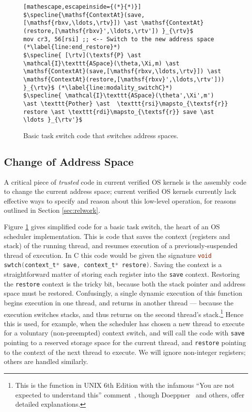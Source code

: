\begin{figure}
\begin{lstlisting}[mathescape,escapeinside={(*}{*)}]
$\specline{\mathsf{ContextAt}(save,[\mathsf{rbxv,\ldots,\rtv}]) \ast \mathsf{ContextAt}(restore,[\mathsf{rbxv}',\ldots,\rtv']) }_{\rtv}$
mov cr3, 56[rsi] ;; <-- Switch to the new address space (*\label{line:end_restore}*)
$\specline{ [\rtv](\textsf{P} \ast \mathcal{I}\texttt{ASpace}(\theta,\Xi,m) \ast \mathsf{ContextAt}(save,[\mathsf{rbxv,\ldots,\rtv}]) \ast \mathsf{ContextAt}(restore,[\mathsf{rbxv}',\ldots,\rtv']))  }_{\rtv}$ (*\label{line:modality_switchC}*)
$\specline{ \mathcal{I}\texttt{ASpace}(\theta',\Xi',m') \ast \texttt{Pother} \ast  \texttt{rsi}\mapsto_{\textsf{r}} restore \ast \texttt{rdi}\mapsto_{\textsf{r}} save \ast \ldots }_{\rtv'}$
\end{lstlisting}
\vspace{-1em}
\caption{Basic task switch code that switches address spaces.}
\label{fig:swtchC}
\end{figure}

\subsection{Change of Address Space}
A critical piece of \emph{trusted} code in current verified OS kernels is the assembly code to change the current address space; current verified OS kernels currently
lack effective ways to specify and reason about this low-level operation, for reasons outlined in Section \ref{sec:relwork}.

Figure \ref{fig:swtchC} gives simplified code for a basic task switch, the heart of an OS scheduler implementation. This is code that saves the context (registers and stack)
of the running thread, and resumes execution of a previously-suspended thread of execution.
In C this code would be given the signature
\mbox{\lstinline[language=C]|void swtch(context_t* save, context_t* restore)|}.
Saving the context is a straightforward matter of storing each register into the \lstinline|save| context.
Restoring the \lstinline|restore| context is the tricky bit, because both the stack pointer and address space must be restored.
Confusingly, a single dynamic execution of this function begins execution in one thread,
and returns in another thread --- because the execution switches stacks, and thus returns on the second thread's stack.\footnote{This is the function in UNIX 6th Edition 
with the infamous ``You are not expected to understand this'' comment~\cite{lions1996lions},
though Doeppner~\cite{doeppner2010operating} and others, offer detailed explanations.}
Hence this is used, for example, when the scheduler has chosen a new thread to execute for a voluntary (non-preempted)
context switch, and will call
the code with \lstinline|save| pointing to a reserved storage space for the current thread, and
\lstinline|restore| pointing to the context of the next thread to execute.
We will ignore non-integer registers; others are handled similarly.

